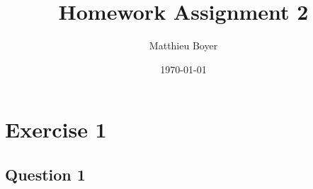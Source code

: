 \documentclass{Cours}
\date{\today}
\author{Matthieu Boyer}
\title{Homework Assignment 2}
\begin{document}
    \section{Exercise 1}
        \subsection{Question 1}
            
\end{document}
